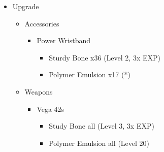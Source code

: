 \begin{upgrade}
\begin{itemize}
    \item Upgrade
    \begin{itemize}
        \item Accessories
        \begin{itemize}
            \item Power Wristband
            \begin{itemize}
                \item Sturdy Bone x36 (Level 2, 3x EXP)
                \item Polymer Emulsion x17 (*)
            \end{itemize}
        \end{itemize}
        \item Weapons
        \begin{itemize}
            \item Vega 42s
            \begin{itemize}
                \item Study Bone all (Level 3, 3x EXP)
                \item Polymer Emulsion all (Level 20)
            \end{itemize}
        \end{itemize}
    \end{itemize}
\end{itemize}
\end{upgrade}

